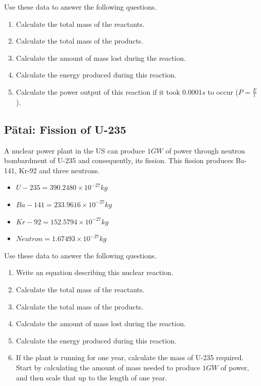 \documentclass[12pt]{report}
\begin{document}
{\noindent Use these data to answer the following questions.

\begin{enumerate}[itemsep=2cm]
	\item Calculate the total mass of the reactants.
	\item Calculate the total mass of the products.
	\item Calculate the amount of mass lost during the reaction.
	\item Calculate the energy produced during this reaction.
	\item Calculate the power output of this reaction if it took $0.0001s$ to occur ($P=\frac{E}{t}$).\vspace{2cm}
\end{enumerate}

\subsection{Pātai: Fission of U-235}
A nuclear power plant in the US can produce $1GW$ of power through neutron bombardment of U-235 and consequently, its fission. This fission produces Ba-141, Kr-92 and three neutrons.

\begin{itemize}
	\item $U-235 = 390.2480 \times 10^{-27} kg$
	\item $Ba-141 = 233.9616 \times 10^{-27} kg$
	\item $Kr-92 = 152.5794 \times 10^{-27} kg$
	\item $Neutron = 1.67493 \times 10^{-27} kg$
\end{itemize}

\noindent Use these data to answer the following questions.
\begin{enumerate}[itemsep=2cm]
	\item Write an equation describing this nuclear reaction.
	\item Calculate the total mass of the reactants.
	\item Calculate the total mass of the products.
	\item Calculate the amount of mass lost during the reaction.
	\item Calculate the energy produced during this reaction.
	\item If the plant is running for one year, calculate the mass of U-235 required. Start by calculating the amount of mass needed to produce $1GW$ of power, and then scale that up to the length of one year.\vspace{4cm}
\end{enumerate}

}
\end{document}
